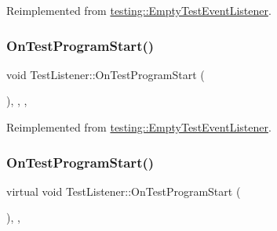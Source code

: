 Reimplemented from \mbox{\hyperlink{classtesting_1_1_empty_test_event_listener_ac3f5033fcd82080edb45f546ce9854fe}{testing\+::\+Empty\+Test\+Event\+Listener}}.

\mbox{\label{class_test_listener_ab1edf894efc1104f7ce35563bc24de23}} 
\subsubsection{\texorpdfstring{OnTestProgramStart()}{OnTestProgramStart()}\hspace{0.1cm}{\footnotesize\ttfamily [2/3]}}
{\footnotesize\ttfamily void Test\+Listener\+::\+On\+Test\+Program\+Start (\begin{DoxyParamCaption}\item[{const \mbox{\hyperlink{classtesting_1_1_unit_test}{Unit\+Test}} \&}]{ }\end{DoxyParamCaption})\hspace{0.3cm}{\ttfamily [inline]}, {\ttfamily [override]}, {\ttfamily [protected]}, {\ttfamily [virtual]}}



Reimplemented from \mbox{\hyperlink{classtesting_1_1_empty_test_event_listener_ac3f5033fcd82080edb45f546ce9854fe}{testing\+::\+Empty\+Test\+Event\+Listener}}.

\mbox{\label{class_test_listener_a6218f522f5b6b37050ff0ea630ac5fd3}} 
\subsubsection{\texorpdfstring{OnTestProgramStart()}{OnTestProgramStart()}\hspace{0.1cm}{\footnotesize\ttfamily [3/3]}}
{\footnotesize\ttfamily virtual void Test\+Listener\+::\+On\+Test\+Program\+Start (\begin{DoxyParamCaption}\item[{const \mbox{\hyperlink{classtesting_1_1_unit_test}{Unit\+Test}} \&}]{ }\end{DoxyParamCaption})\hspace{0.3cm}{\ttfamily [inline]}, {\ttfamily [protected]}, {\ttfamily [virtual]}}



